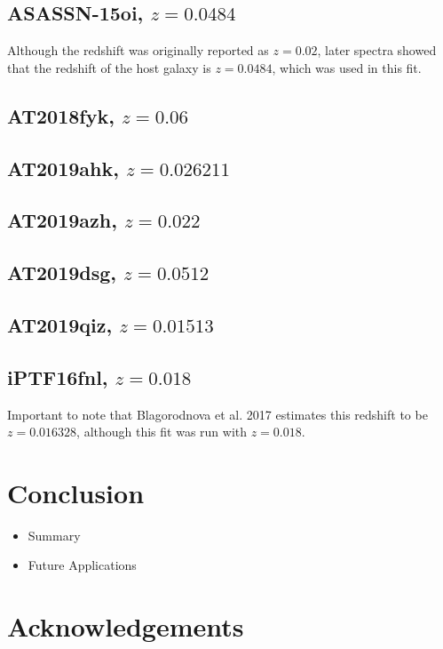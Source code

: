 \documentclass[a4paper,11pt]{article}
\begin{document}
\subsection{ASASSN-15oi, $z=0.0484$}\label{sec:ASASSN-15oi}

Although the redshift was originally reported as $z=0.02$, later spectra showed that the redshift of the host galaxy is $z=0.0484$, which was used in this fit.\cite{Arcavi_2015, Holoien_2016b}
\subsection{AT2018fyk, $z=0.06$}\label{sec:AT2018fyk}
\subsection{AT2019ahk, $z=0.026211$}\label{sec:AT2019ahk}
\subsection{AT2019azh, $z=0.022$}\label{sec:AT2019azh}
\subsection{AT2019dsg, $z=0.0512$}\label{sec:AT2019dsg}
\subsection{AT2019qiz, $z=0.01513$}\label{sec:AT2019qiz}
\subsection{iPTF16fnl, $z=0.018$}\label{sec:iPTF16fnl}
Important to note that Blagorodnova et al. 2017 estimates this redshift to be $z=0.016328$, although this fit was run with $z=0.018$.\cite{Blagorodnova_2017}
\section{Conclusion}\label{sec:conclusion}
\begin{itemize}
  \item Summary
  \item Future Applications
\end{itemize}
\section{Acknowledgements}\label{sec:acknowledgements}
\end{document}
